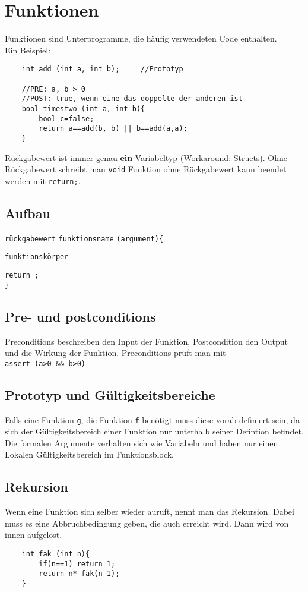 \section{Funktionen}
Funktionen sind Unterprogramme, die häufig verwendeten Code enthalten.\\
Ein Beispiel:
\begin{lstlisting}
	int add (int a, int b); 	//Prototyp
	
	//PRE: a, b > 0
	//POST: true, wenn eine das doppelte der anderen ist
	bool timestwo (int a, int b){
		bool c=false;
		return a==add(b, b) || b==add(a,a);
	}
\end{lstlisting}
Rückgabewert ist immer genau \textbf{ein} Variabeltyp (Workaround: Structs). Ohne Rückgabewert schreibt man \texttt{void} Funktion ohne Rückgabewert kann beendet werden mit \texttt{return;}.
\subsection{Aufbau}
\texttt{rückgabewert} \texttt{funktionsname} \texttt{(argument)}\texttt{\{}

\hspace{10pt}\texttt{funktionskörper}

\hspace{10pt}\texttt{return ;}\\
\texttt{\}}
\subsection{Pre- und postconditions}
Preconditions beschreiben den Input der Funktion, Postcondition den Output und die Wirkung der Funktion. Preconditions prüft man mit\\ \texttt{assert (a>0 \&\& b>0)}
\subsection{Prototyp und Gültigkeitsbereiche}
Falls eine Funktion \texttt{g}, die Funktion \texttt{f} benötigt muss diese vorab definiert sein, da sich der Gültigkeitsbereich einer Funktion nur unterhalb seiner Defintion befindet. Die formalen Argumente verhalten sich wie Variabeln und haben nur einen Lokalen Gültigkeitsbereich im Funktionsblock.
\subsection{Rekursion}
Wenn eine Funktion sich selber wieder auruft, nennt man das Rekursion. Dabei muss es eine Abbruchbedingung geben, die auch erreicht wird. Dann wird von innen aufgelöst.
\begin{lstlisting}
	int fak (int n){
		if(n==1) return 1;
		return n* fak(n-1);
	}
\end{lstlisting}



